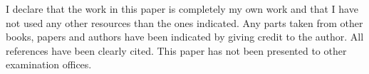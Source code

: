 \declarationofhonorchap

I declare that the work in this paper is completely my own work and that I have not used any other resources than the ones indicated. Any parts taken from other books, papers and authors have been indicated by giving credit to the author. All references have been clearly cited. This paper has not been presented to other examination offices. 

\vspace{1cm}
\noindent
{}

\vspace{1.5cm}
\noindent
\insertauthor